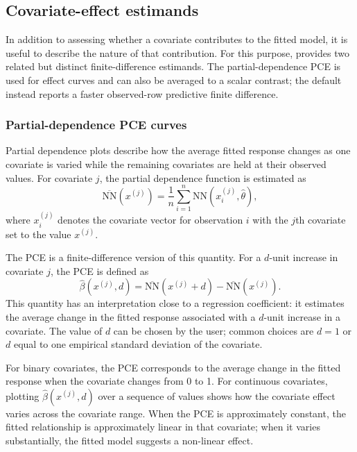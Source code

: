 \subsection{Covariate-effect estimands}\label{covariate-effect-estimands}

In addition to assessing whether a covariate contributes to the fitted model, it is useful to describe the nature of that contribution.
For this purpose,  provides two related but distinct finite-difference estimands.
The partial-dependence PCE is used for effect curves and can also be averaged to a scalar contrast; the default  instead reports a faster observed-row predictive finite difference.

\subsubsection{Partial-dependence PCE curves}\label{partial-dependence-pce-curves}

Partial dependence plots describe how the average fitted response changes as one covariate is varied while the remaining covariates are held at their observed values.
For covariate \(j\), the partial dependence function is estimated as \[
  \overline{\mathrm{NN}}(x^{(j)})
  =
  \frac{1}{n}
  \sum_{i=1}^n
  \mathrm{NN}(x_i^{(j)}, \hat{\theta}),
\] where \(x_i^{(j)}\) denotes the covariate vector for observation \(i\) with the \(j\)th covariate set to the value \(x^{(j)}\).

The PCE is a finite-difference version of this quantity.
For a \(d\)-unit increase in covariate \(j\), the PCE is defined as \[
  \hat{\beta}(x^{(j)}, d)
  =
  \overline{\mathrm{NN}}(x^{(j)} + d)
  -
  \overline{\mathrm{NN}}(x^{(j)}).
\] This quantity has an interpretation close to a regression coefficient: it estimates the average change in the fitted response associated with a \(d\)-unit increase in a covariate.
The value of \(d\) can be chosen by the user; common choices are \(d = 1\) or \(d\) equal to one empirical standard deviation of the covariate.

For binary covariates, the PCE corresponds to the average change in the fitted response when the covariate changes from 0 to 1.
For continuous covariates, plotting \(\hat{\beta}(x^{(j)}, d)\) over a sequence of values shows how the covariate effect varies across the covariate range.
When the PCE is approximately constant, the fitted relationship is approximately linear in that covariate; when it varies substantially, the fitted model suggests a non-linear effect.

